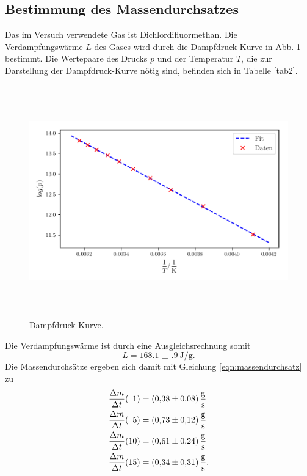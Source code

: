 \subsection{Bestimmung des Massendurchsatzes}
Das im Versuch verwendete Gas ist Dichlordifluormethan.
Die Verdampfungswärme $L$ des Gases wird durch die Dampfdruck-Kurve
in Abb. \ref{fig:plot2} bestimmt.
Die Wertepaare des Drucks $p$ und der Temperatur $T$, die zur
Darstellung der Dampfdruck-Kurve nötig sind, befinden sich in
Tabelle \ref{tab2}. 

\begin{figure}
    \centering
    \includegraphics[width=14cm, height=10cm]{build/plot2.pdf}
    \caption{Dampfdruck-Kurve.}
    \label{fig:plot2}
\end{figure}
\noindent Die Verdampfungswärme ist durch eine Ausgleichsrechnung somit
\begin{equation*}
    L = \SI{168.1(9)}{\joule\per\gram}. %
\end{equation*}
Die Massendurchsätze ergeben sich damit mit Gleichung \eqref{eqn:massendurchsatz} zu %
\begin{align*}
    \frac{\Delta m}{\Delta t}(\phantom{1}1) &= \SI{0.38 \pm 0.08}{\gram\per\second} \\
    \frac{\Delta m}{\Delta t}(\phantom{1}5) &= \SI{0.73 \pm 0.12}{\gram\per\second} \\
    \frac{\Delta m}{\Delta t}(10) &= \SI{0.61 \pm 0.24}{\gram\per\second} \\
    \frac{\Delta m}{\Delta t}(15) &= \SI{0.34 \pm 0.31}{\gram\per\second}. %
\end{align*}

